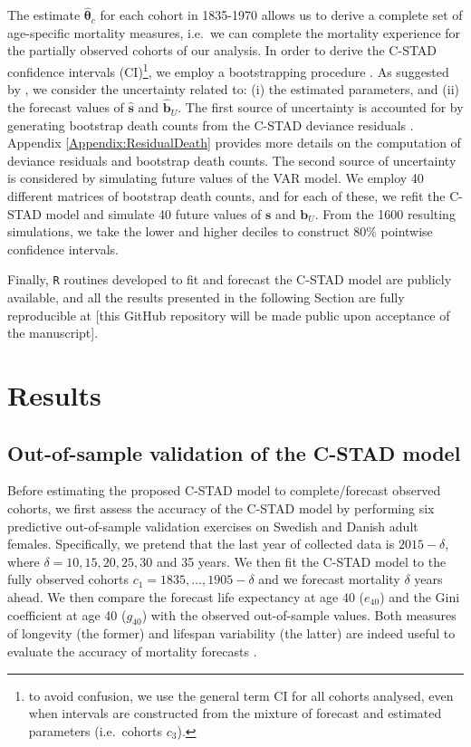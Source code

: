 \documentclass[11pt, a4paper]{article}
\begin{document}
The estimate $\hat{\bm{\theta}}_c$ for each cohort in 1835-1970 allows us to derive a complete set of age-specific mortality measures, i.e.~we can complete the mortality experience for the partially observed cohorts of our analysis. In order to derive the C-STAD confidence intervals (CI)\footnote{to avoid confusion, we use the general term CI for all cohorts analysed, even when intervals are constructed from the mixture of forecast and estimated parameters (i.e.~cohorts $c_3$).}, we employ a bootstrapping procedure \citep{efron1994introduction}. As suggested by \cite{keilman2006prediction}, we consider the uncertainty related to: (i) the estimated parameters, and (ii) the forecast values of $\hat{\bm{s}}$ and $\hat{\bm{b}}_U$. The first source of uncertainty is accounted for by generating bootstrap death counts from the C-STAD deviance residuals \cite[as in, for example,][]{koissi2006evaluating,renshaw2008simulation,ouellette2012regional}. Appendix \ref{Appendix:ResidualDeath} provides more details on the computation of deviance residuals and bootstrap death counts. The second source of uncertainty is considered by simulating future values of the VAR model. We employ 40 different matrices of bootstrap death counts, and for each of these, we refit the C-STAD model and simulate 40 future values of $\bm{s}$ and $\bm{b}_U$. From the 1600 resulting simulations, we take the lower and higher deciles to construct 80\% pointwise confidence intervals.

Finally, \texttt{R} routines developed to fit and forecast the C-STAD model are publicly available, and all the results presented in the following Section are fully reproducible at [this GitHub repository will be made public upon acceptance of the manuscript]. 

\section{Results}
\label{Sec:Results}

\subsection{Out-of-sample validation of the C-STAD model}
\label{Subsec:Out-of-sample}
Before estimating the proposed C-STAD model to complete/forecast observed cohorts, we first assess the accuracy of the C-STAD model by performing six predictive out-of-sample validation exercises on Swedish and Danish adult females. Specifically, we pretend that the last year of collected data is $2015 - \delta$, where $\delta=10,15,20,25,30$ and 35 years. We then fit the C-STAD model to the fully observed cohorts $c_1=1835,\ldots,1905-\delta$ and we forecast mortality $\delta$ years ahead. We then compare the forecast life expectancy at age 40 ($e_{40}$) and the Gini coefficient at age 40 ($g_{40}$) with the observed out-of-sample values. Both measures of longevity (the former) and lifespan variability (the latter) are indeed useful to evaluate the accuracy of mortality forecasts \citep{bohk2017lifespan}.
\end{document}
